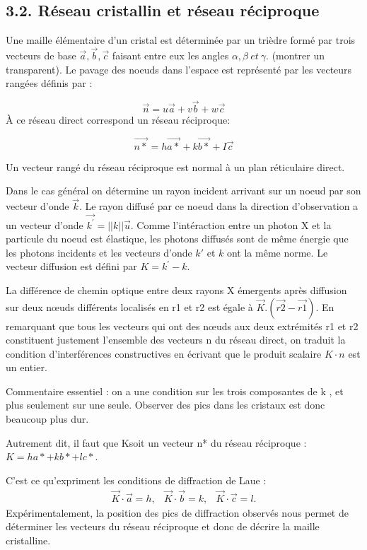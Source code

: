 \documentclass[french, a4paper, 10pt, twocolumn, landscape]{article}
\begin{document}
\subsection*{3.2. Réseau cristallin et réseau réciproque}

Une maille élémentaire d'un cristal est déterminée par un trièdre formé par trois vecteurs de base $\vec{a},\vec{b},\vec{c}$ faisant entre eux les angles $\alpha,\beta~ et~ \gamma$. (montrer un transparent). Le pavage des noeuds dans l'espace est représenté par les vecteurs rangées définis par : 

\begin{equation}
    \vec{n} = u\vec{a}+v\vec{b}+w\vec{c}
\end{equation}
À ce réseau direct correspond un réseau réciproque:

\begin{equation}
    \vec{n*} = h\vec{a*}+k\vec{b*}+I\vec{c}
\end{equation}

Un vecteur rangé du réseau réciproque est normal à un plan réticulaire direct.\medskip

Dans le cas général on détermine un rayon incident arrivant sur un noeud par son vecteur d'onde $\vec{k}$. Le rayon diffusé par ce noeud dans la direction d'observation a un vecteur d'onde $\vec{k^\prime} = ||k||\vec{u}$. Comme l'intéraction entre un photon X et la particule du noeud est élastique, les photons diffusés sont de même énergie que les photons incidents et les vecteurs d'onde $k\prime$ et $k$ ont la même norme. Le vecteur diffusion est défini par $K = k^\prime - k$.

La différence de chemin optique entre deux rayons X émergents après diffusion sur deux nœuds différents localisés en r1 et r2 est égale à $\vec{K}.(\vec{r2}- \vec{r1})$. En remarquant que tous les vecteurs qui ont des nœuds aux deux extrémités r1 et r2 constituent justement l'ensemble des vecteurs n du réseau direct, on traduit la condition d'interférences constructives en écrivant que le produit scalaire $K\cdot n$ est un entier.

Commentaire essentiel : on
a une condition sur les trois composantes de k , et plus seulement
sur une seule. Observer des pics dans les cristaux est donc beaucoup
plus dur.

Autrement dit, il faut que Ksoit un vecteur n* du réseau réciproque : $K= h a* + k b* + l c*$.

C'est ce qu'expriment les conditions de diffraction de Laue :
\begin{equation}
    \begin{array}{ccc}
    \vec{K}\cdot \vec{a} = h, &\vec{K}\cdot \vec{b} = k, & \vec{K}\cdot \vec{c} = l.
\end{array}
\end{equation}
Expérimentalement, la position des pics de diffraction observés nous permet de déterminer les vecteurs du réseau réciproque et donc de décrire la maille cristalline.
\end{document}
